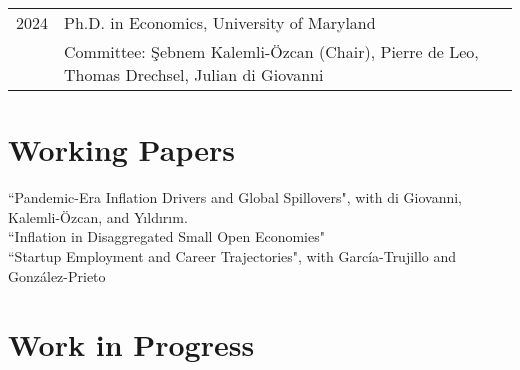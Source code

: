 \documentclass[10pt]{article}
\begin{document}
\begin{tabular}{@{}p{1.8cm}p{13cm}}
    2024 & Ph.D. in Economics, University of Maryland\\
   & \small Committee: \c{S}ebnem Kalemli-\"{O}zcan (Chair), Pierre de Leo, Thomas Drechsel, Julian di Giovanni\\
\end{tabular}


\section*{Working Papers}

\noindent ``Pandemic-Era Inflation Drivers and Global Spillovers", with di Giovanni, Kalemli-\"{O}zcan, and Y{\i}ld{\i}r{\i}m. \\[-0.125in]



\noindent ``Inflation in Disaggregated Small Open Economies"\\[-0.125in]

\noindent ``Startup Employment and Career Trajectories", with Garc\'ia-Trujillo and Gonz\'alez-Prieto





\section*{Work in Progress}
\end{document}

